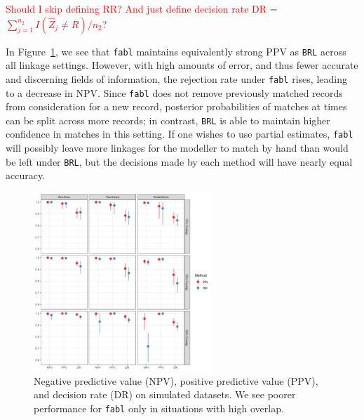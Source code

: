 \documentclass[ba]{imsart}
\begin{document}
	\textcolor{red}{Should I skip defining RR? And just define decision rate DR = $\sum_{j=1}^{n_2} I(\hat{Z}_j \neq R)/n_2$?}
	
	In Figure~\ref{fig:sadinle_simulation_partial}, we see that \texttt{fabl} maintains equivalently strong PPV as \texttt{BRL} across all linkage settings. However, with high amounts of error, and thus fewer accurate and discerning fields of information, the rejection rate under \texttt{fabl} rises, leading to a decrease in NPV. Since \texttt{fabl} does not remove previously matched records from consideration for a new record, posterior probabilities of matches at times can be split across more records; in contrast, \texttt{BRL} is able to maintain higher confidence in matches in this setting. If one wishes to use partial estimates, \texttt{fabl} will possibly leave more linkages for the modeller to match by hand than would be left under \texttt{BRL}, but the decisions made by each method will have nearly equal accuracy. 
	
	
	
	\begin{figure}[t]
		\begin{center}
			\includegraphics[width=0.6\textwidth]{../notes/figures/sadinle_sim_plot_partial_DR} 
			\caption{Negative predictive value (NPV), positive predictive value (PPV), and decision rate (DR) on simulated datasets. We see poorer performance for \texttt{fabl} only in situations with high overlap.}
			\label{fig:sadinle_simulation_partial}
		\end{center}
	\end{figure}
	
\end{document}
